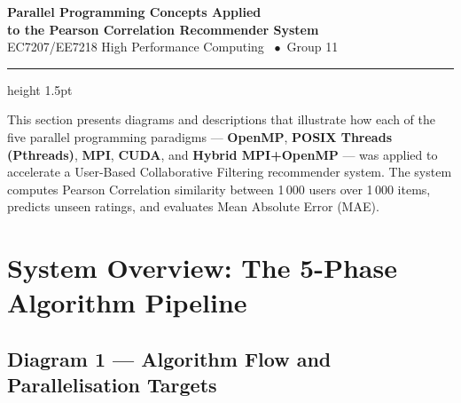 \documentclass[12pt,a4paper]{article}
\begin{document}

\begin{center}
{\LARGE\bfseries Parallel Programming Concepts Applied}\\[0.4em]
{\large\bfseries to the Pearson Correlation Recommender System}\\[0.3em]
{\normalsize EC7207/EE7218 High Performance Computing \ $\bullet$\  Group 11}
\end{center}
\vspace{0.5em}
\hrule height 1.5pt
\vspace{1em}

\noindent
This section presents diagrams and descriptions that illustrate how each of the
five parallel programming paradigms — \textbf{OpenMP}, \textbf{POSIX Threads
(Pthreads)}, \textbf{MPI}, \textbf{CUDA}, and \textbf{Hybrid MPI+OpenMP} — was
applied to accelerate a User-Based Collaborative Filtering recommender system.
The system computes Pearson Correlation similarity between 1\,000 users over
1\,000 items, predicts unseen ratings, and evaluates Mean Absolute Error (MAE).

\vspace{0.5em}

\section{System Overview: The 5-Phase Algorithm Pipeline}

\subsection*{Diagram 1 — Algorithm Flow and Parallelisation Targets}
\end{document}
